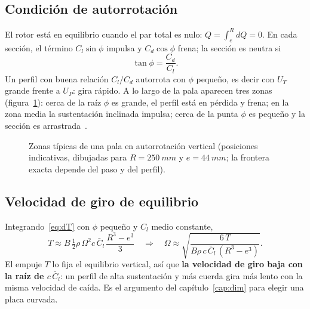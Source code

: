 \subsection{Condición de autorrotación}
El rotor está en equilibrio cuando el par total es nulo: $Q=\int_{e}^{R}dQ=0$. En cada
sección, el término $C_l\sin\phi$ impulsa y $C_d\cos\phi$ frena; la sección es neutra si
\begin{equation}
  \tan\phi = \frac{C_d}{C_l}. \label{eq:autorrot}
\end{equation}
Un perfil con buena relación $C_l/C_d$ autorrota con $\phi$ pequeño, es decir con $U_T$
grande frente a $U_P$: gira rápido. A lo largo de la pala aparecen tres zonas
(figura~\ref{fig:zonas}): cerca de la raíz $\phi$ es grande, el perfil está en pérdida y
frena; en la zona media la sustentación inclinada impulsa; cerca de la punta $\phi$ es
pequeño y la sección es arrastrada~\cite{leishman2006}.

\begin{figure}[H]
\centering
{}
\caption{Zonas típicas de una pala en autorrotación vertical (posiciones indicativas, dibujadas
para $R=\SI{250}{mm}$ y $e=\SI{44}{mm}$; la frontera exacta depende del paso y del perfil).}
\label{fig:zonas}
\end{figure}

\subsection{Velocidad de giro de equilibrio}
Integrando~\eqref{eq:dT} con $\phi$ pequeño y $C_l$ medio constante,
\begin{equation}
  T \approx B\,\tfrac12\rho\,\Omega^2 c\,\bar C_l\,\frac{R^3-e^3}{3}
  \quad\Rightarrow\quad
  \Omega \approx \sqrt{\frac{6\,T}{B\rho\,c\,\bar C_l\,(R^3-e^3)}} .
  \label{eq:omega}
\end{equation}
El empuje $T$ lo fija el equilibrio vertical, así que \textbf{la velocidad de giro baja
con la raíz de $c\,\bar C_l$}: un perfil de alta sustentación y más cuerda gira más lento
con la misma velocidad de caída. Es el argumento del capítulo~\ref{cap:dim} para elegir
una placa curvada.

